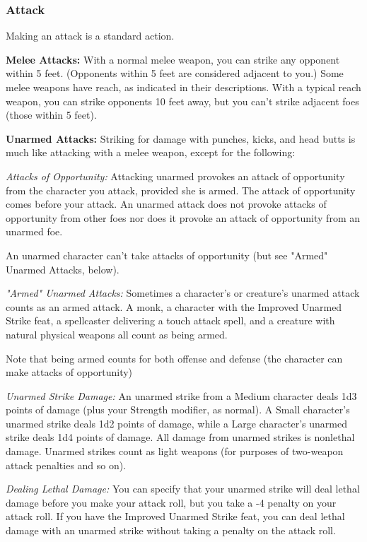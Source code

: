 \subsubsection{Attack}

Making an attack is a standard action.

\textbf{Melee Attacks:} With a normal melee weapon, you can strike any opponent within 5 feet. (Opponents within 5 feet are considered adjacent to you.) Some melee weapons have reach, as indicated in their descriptions. With a typical reach weapon, you can strike opponents 10 feet away, but you can't strike adjacent foes (those within 5 feet).

\textbf{Unarmed Attacks:} Striking for damage with punches, kicks, and head butts is much like attacking with a melee weapon, except for the following:

\textit{Attacks of Opportunity:} Attacking unarmed provokes an attack of opportunity from the character you attack, provided she is armed. The attack of opportunity comes before your attack. An unarmed attack does not provoke attacks of opportunity from other foes nor does it provoke an attack of opportunity from an unarmed foe.

An unarmed character can't take attacks of opportunity (but see "Armed" Unarmed Attacks, below).

\textit{"Armed" Unarmed Attacks:} Sometimes a character's or creature's unarmed attack counts as an armed attack. A monk, a character with the Improved Unarmed Strike feat, a spellcaster delivering a touch attack spell, and a creature with natural physical weapons all count as being armed.

Note that being armed counts for both offense and defense (the character can make attacks of opportunity)

\textit{Unarmed Strike Damage:} An unarmed strike from a Medium character deals 1d3 points of damage (plus your Strength modifier, as normal). A Small character's unarmed strike deals 1d2 points of damage, while a Large character's unarmed strike deals 1d4 points of damage. All damage from unarmed strikes is nonlethal damage. Unarmed strikes count as light weapons (for purposes of two-weapon attack penalties and so on).

\textit{Dealing Lethal Damage:} You can specify that your unarmed strike will deal lethal damage before you make your attack roll, but you take a -4 penalty on your attack roll. If you have the Improved Unarmed Strike feat, you can deal lethal damage with an unarmed strike without taking a penalty on the attack roll.

